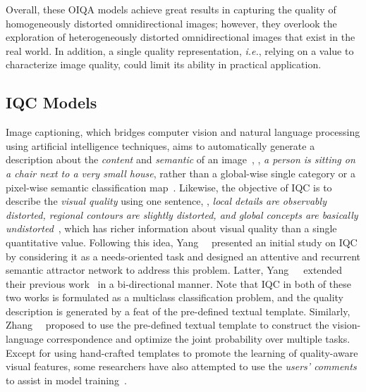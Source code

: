 Overall, these OIQA models achieve great results in capturing the quality of homogeneously distorted omnidirectional images; however, they overlook the exploration of heterogeneously distorted omnidirectional images that exist in the real world. In addition, a single quality representation, \emph{i.e.}, relying on a value to characterize image quality, could limit its ability in practical application.
\subsection{IQC Models}
\label{subsec:iqc_method}

Image captioning, which bridges computer vision and natural language processing using artificial intelligence techniques, aims to automatically generate a description about the \textit{content} and \textit{semantic} of an image~\cite{vinyals2015show}, \eg, \textit{a person is sitting on a chair next to a very small house}, rather than a global-wise single category or a pixel-wise semantic classification map~\cite{yan2021exposing}. Likewise, the objective of IQC is to describe the \textit{visual quality} using one sentence, \eg, \textit{local details are observably distorted, regional contours are slightly distorted, and global concepts are basically undistorted}~\cite{yang2021image}, which has richer information about visual quality than a single quantitative value. Following this idea, Yang~\et~\cite{yang2021image} presented an initial study on IQC by considering it as a needs-oriented task and designed an attentive and recurrent semantic attractor network to address this problem. Latter, Yang~\et~\cite{yang2022fine}~extended their previous work~\cite{yang2021image} in a bi-directional manner. Note that IQC in both of these two works is formulated as a multiclass classification problem, and the quality description is generated by a feat of the pre-defined textual template. Similarly, Zhang~\et~\cite{zhang2023blind} proposed to use the pre-defined textual template to construct the vision-language correspondence and optimize the joint probability over multiple tasks. Except for using hand-crafted templates to promote the learning of quality-aware visual features, some researchers have also attempted to use the \textit{users' comments} to assist in model training~\cite{nie2023bmi,zhong2023aesthetically}. 



